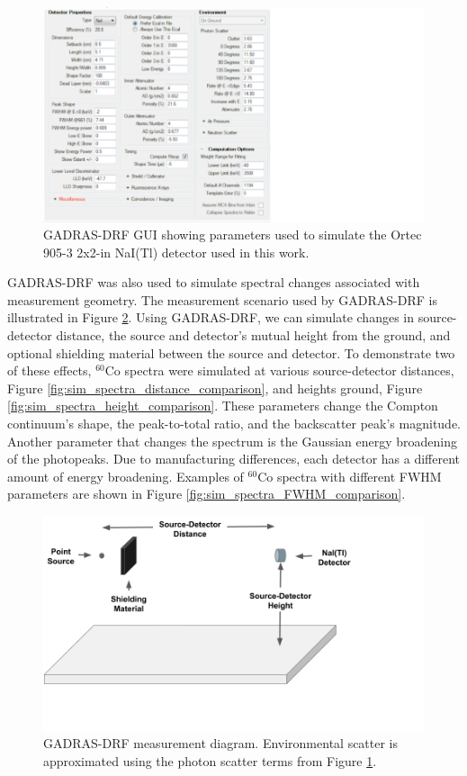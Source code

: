 \begin{figure}[H]
	\centering
	\includegraphics[trim=0 0 390 0,clip,width=0.7\linewidth]{images/gadras_parameters}
	\caption{GADRAS-DRF GUI showing parameters used to simulate the Ortec 905-3 2x2-in NaI(Tl) detector used in this work.}
	\label{fig:gadras_parameters}
\end{figure}


GADRAS-DRF was also used to simulate spectral changes associated with measurement geometry. The measurement scenario used by GADRAS-DRF is illustrated in Figure \ref{fig:gadras_measurement_setup}. Using GADRAS-DRF, we can simulate changes in source-detector distance, the source and detector's mutual height from the ground, and optional shielding material between the source and detector. To demonstrate two of these effects, $^{60}$Co spectra were simulated at various source-detector distances, Figure \ref{fig:sim_spectra_distance_comparison}, and heights ground, Figure \ref{fig:sim_spectra_height_comparison}. These parameters change the Compton continuum's shape, the peak-to-total ratio, and the backscatter peak's magnitude. Another parameter that changes the spectrum is the Gaussian energy broadening of the photopeaks. Due to manufacturing differences, each detector has a different amount of energy broadening. Examples of $^{60}$Co spectra with different FWHM parameters are shown in Figure \ref{fig:sim_spectra_FWHM_comparison}.


\begin{figure}[H]
	\centering
	\includegraphics[trim=0 0 180 0,clip,width=0.9\linewidth]{images/gadras_measurement_setup}
	\caption{GADRAS-DRF measurement diagram. Environmental scatter is approximated using the photon scatter terms from Figure \ref{fig:gadras_parameters}.}
	\label{fig:gadras_measurement_setup}
\end{figure}



